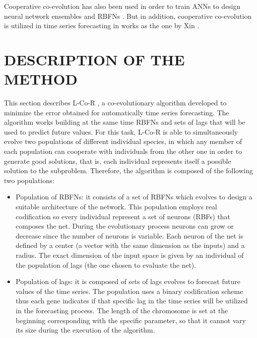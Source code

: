 \documentclass[a4paper,twoside]{article}
\newcommand{\metodo}{L-Co-R}
\begin{document}
Cooperative co-evolution \cite{Potter94} has also been used in order to train ANNs to design neural network ensembles \cite{Garcia-Pedrajas05} and RBFNs \cite{Li08}. But in addition, cooperative co-evolution is utilized in time series forecasting in works as the one by Xin \cite{Xin10}. 


\section{\uppercase{Description of the method}}
\label{sec:method}

\noindent This section describes {\metodo} \cite{Parras2012Softcomputing}, a co-evolutionary algorithm developed to minimize the error obtained for automatically time series forecasting. The algorithm works building at the same time RBFNs and sets of lags that will be used to predict future values. For this task, {\metodo} is able to simultaneously evolve two populations of different individual species, in which any member of each population can cooperate with individuals from the other one in order to generate good solutions, that is, each individual represents itself a possible solution to the subproblem. Therefore, the algorithm is composed of the following two populations:

\begin{itemize}
  \item Population of RBFNs: it consists of a set of RBFNs which evolves to design a suitable architecture of the network. This population employs real codification so every individual represent a set of neurons (RBFs) that composes the net. During the evolutionary process neurons can grow or decrease since the number of neurons is variable. Each neuron of the net is defined by a center (a vector with the same dimension as the inputs) and a radius. The exact dimension of the input space is given by an individual of the population of lags (the one chosen to evaluate the net).

  \item Population of lags: it is composed of sets of lags evolves to forecast future values of the time series. The population uses a binary codification scheme thus each gene indicates if that specific lag in the time series will be utilized in the forecasting process. The length of the chromosome is set at the beginning corresponding with the specific parameter, so that it cannot vary its size during the execution of the algorithm.
\end{itemize}
\end{document}
